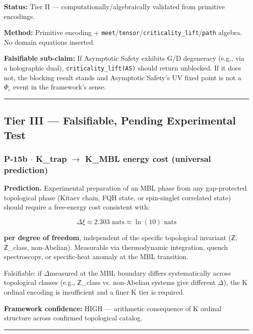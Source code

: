 \documentclass[12pt,a4paper]{article}
\begin{document}
\textbf{Status:} Tier II --- computationally/algebraically validated from primitive encodings.

\textbf{Method:} Primitive encoding + \texttt{meet}/\texttt{tensor}/\texttt{criticality\_lift}/\texttt{path} algebra. No domain equations inserted.

\textbf{Falsifiable sub-claim:} If Asymptotic Safety exhibits G/D degeneracy (e.g., via a holographic dual), \texttt{criticality\_lift(AS)} should return unblocked. If it does not, the blocking result stands and Asymptotic Safety's UV fixed point is not a $\Phi_c$ event in the framework's sense.

\begin{center}
\rule{0.5\textwidth}{0.4pt}
\end{center}

\subsection{Tier III --- Falsifiable, Pending Experimental Test}

\subsubsection{P-15b $\cdot$ K\_trap $\rightarrow$ K\_MBL energy cost (universal prediction)}

\textbf{Prediction.} Experimental preparation of an MBL phase from any gap-protected topological phase (Kitaev chain, FQH state, or spin-singlet correlated state) should require a free-energy cost consistent with:

\[\Delta\xi \approx 2.303 \text{ nats} \approx \ln(10) \text{ nats}\]

\textbf{per degree of freedom}, independent of the specific topological invariant (ℤ, ℤ\_class, non-Abelian). Measurable via thermodynamic integration, quench spectroscopy, or specific-heat anomaly at the MBL transition.

Falsifiable: if $\Delta$\xi measured at the MBL boundary differs systematically across topological classes (e.g., ℤ\_class vs. non-Abelian systems give different $\Delta$\xi), the K ordinal encoding is insufficient and a finer K tier is required.

\textbf{Framework confidence:} HIGH --- arithmetic consequence of K ordinal structure across confirmed topological catalog.

\begin{center}
\rule{0.5\textwidth}{0.4pt}
\end{center}
\end{document}
